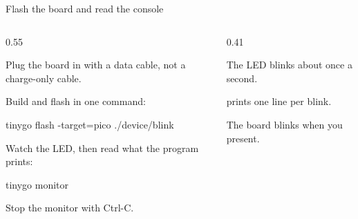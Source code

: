 \documentclass[10pt,aspectratio=169,t]{beamer}
\begin{document}
\begin{frame}[fragile,embedded,eyebrow=Task II]{Flash the board and read the console}
  \begin{columns}[T]
    \begin{column}{0.55\textwidth}
      \begin{steps}
        \item Plug the board in with a data cable, not a charge-only cable.
        \item Build and flash in one command:
\begin{shell}
tinygo flash -target=pico ./device/blink
\end{shell}
        \item Watch the LED, then read what the program prints:
\begin{shell}
tinygo monitor
\end{shell}
        \item Stop the monitor with Ctrl-C.
      \end{steps}
    \end{column}
    \begin{column}{0.41\textwidth}
      \begin{checklist}
        \item The LED blinks about once a second.
        \item {} prints one line per blink.
        \item The board blinks when you present.
      \end{checklist}
    \end{column}
  \end{columns}
\end{frame}
\end{document}
